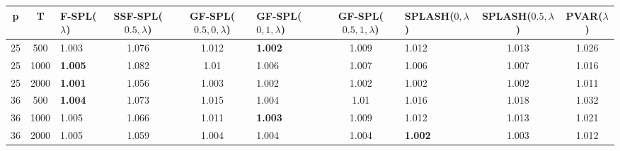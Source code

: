 \begin{tabular}{cclcclclcc}
\hline
  p  &  T   & F-SPL($\lambda$)   &  SSF-SPL($0.5, \lambda$)  &  GF-SPL($0.5, 0, \lambda$)  & GF-SPL($0, 1, \lambda$)   &  GF-SPL($0.5, 1, \lambda$)  & SPLASH($0, \lambda$)   &  SPLASH($0.5, \lambda$)  &  PVAR($\lambda$)  \\
\hline
 25  & 500  & 1.003              &           1.076           &            1.012            & \textbf{1.002}            &            1.009            & 1.012                  &          1.013           &       1.026       \\
 25  & 1000 & \textbf{1.005}     &           1.082           &            1.01             & 1.006                     &            1.007            & 1.006                  &          1.007           &       1.016       \\
 25  & 2000 & \textbf{1.001}     &           1.056           &            1.003            & 1.002                     &            1.002            & 1.002                  &          1.002           &       1.011       \\
 36  & 500  & \textbf{1.004}     &           1.073           &            1.015            & 1.004                     &            1.01             & 1.016                  &          1.018           &       1.032       \\
 36  & 1000 & 1.005              &           1.066           &            1.011            & \textbf{1.003}            &            1.009            & 1.012                  &          1.013           &       1.021       \\
 36  & 2000 & 1.005              &           1.059           &            1.004            & 1.004                     &            1.004            & \textbf{1.002}         &          1.003           &       1.012       \\
\hline
\end{tabular}